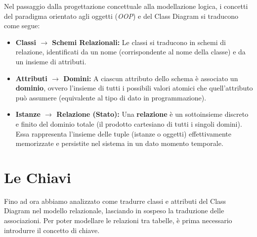 \begin{tip}[In sintesi:]
Nel passaggio dalla progettazione concettuale alla modellazione logica, i concetti del paradigma orientato agli oggetti (\textit{OOP}) e del Class Diagram si traducono come segue:

\begin{itemize}
    \item \textbf{Classi $\rightarrow$ Schemi Relazionali:} Le classi si traducono in schemi di relazione, identificati da un nome (corrispondente al nome della classe) e da un insieme di attributi.
    \item \textbf{Attributi $\rightarrow$ Domini:} A ciascun attributo dello schema è associato un \textbf{dominio}, ovvero l'insieme di tutti i possibili valori atomici che quell'attributo può assumere (equivalente al tipo di dato in programmazione).
    \item \textbf{Istanze $\rightarrow$ Relazione (Stato):} Una \textbf{relazione} è un sottoinsieme discreto e finito del dominio totale (il prodotto cartesiano di tutti i singoli domini). Essa rappresenta l'insieme delle tuple (istanze o oggetti) effettivamente memorizzate e persistite nel sistema in un dato momento temporale.
\end{itemize}
\end{tip}





\section{Le Chiavi}

Fino ad ora abbiamo analizzato come tradurre classi e attributi del Class Diagram nel modello relazionale, lasciando in sospeso la traduzione delle associazioni. Per poter modellare le relazioni tra tabelle, è prima necessario introdurre il concetto di chiave.

